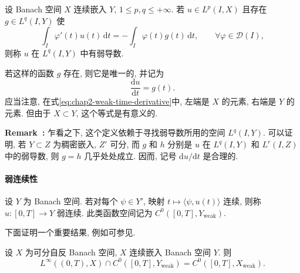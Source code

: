 \begin{Definition}
\label{def:chap2-weak-time-derivative}
设 Banach 空间 $X$ 连续嵌入 $Y$, $1\leq p,q\leq+\infty$. 若 $u\in L^p(I,X)$ 且存在 $g\in L^q(I,Y)$ 使
\begin{equation}
 \int_I\varphi'(t)u(t)\,\mathrm{d}t
 =-\int_I\varphi(t)g(t)\,\mathrm{d}t,
 \qquad\forall\varphi\in\mathcal{D}(I),
 \label{eq:chap2-weak-time-derivative}
\end{equation}
则称 $u$ 在 $L^q(I,Y)$ 中有弱导数.
\end{Definition}

若这样的函数 $g$ 存在, 则它是唯一的, 并记为
\[
 \frac{\mathrm{d}u}{\mathrm{d}t}=g(t).
\]
应当注意, 在式\eqref{eq:chap2-weak-time-derivative}中, 左端是 $X$ 的元素, 右端是 $Y$ 的元素. 但由于 $X\subset Y$, 这个等式是有意义的.

\par\noindent{}\textbf{Remark~\thechapterfiveremark:}\quad
\label{rem:chap2-weak-time-derivative-target-space}
乍看之下, 这个定义依赖于寻找弱导数所用的空间 $L^q(I,Y)$. 可以证明, 若 $Y\subset Z$ 为稠密嵌入, $Z'$ 可分, 而 $g$ 和 $h$ 分别是 $u$ 在 $L^q(I,Y)$ 和 $L^r(I,Z)$ 中的弱导数, 则 $g=h$ 几乎处处成立. 因而, 记号 $\mathrm{d}u/\mathrm{d}t$ 是合理的.
\par

\paragraph{弱连续性}

\begin{Definition}
\label{def:chap2-weakly-continuous-function}
设 $Y$ 为 Banach 空间. 若对每个 $\psi\in Y'$, 映射 $t\mapsto\langle\psi,u(t)\rangle$ 连续, 则称 $u:[0,T]\to Y$ 弱连续. 此类函数空间记为 $C^0([0,T],Y_{\mathrm{weak}})$.
\end{Definition}

下面证明一个重要结果, 例如可参见.

\begin{Lemma}
\label{lem:chap2-weak-continuity-transfer}
设 $X$ 为可分自反 Banach 空间, $X$ 连续嵌入 Banach 空间 $Y$. 则
\[
 L^\infty((0,T),X)\cap C^0([0,T],Y_{\mathrm{weak}})
 =C^0([0,T],X_{\mathrm{weak}}).
\]
\end{Lemma}

